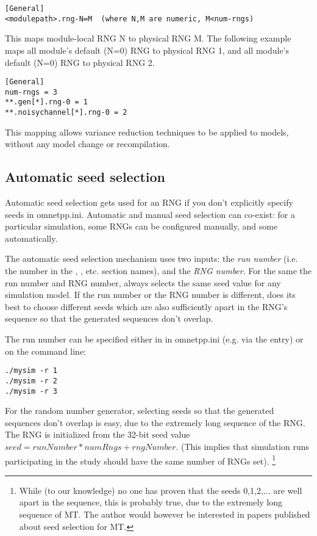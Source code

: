 \begin{verbatim}
[General]
<modulepath>.rng-N=M  (where N,M are numeric, M<num-rngs)
\end{verbatim}

This maps module-local RNG N to physical RNG M. The following
example maps all   module's default (N=0) RNG to physical RNG 1,
and all   module's default (N=0) RNG to physical RNG 2.

\begin{verbatim}
[General]
num-rngs = 3
**.gen[*].rng-0 = 1
**.noisychannel[*].rng-0 = 2
\end{verbatim}

This mapping allows variance reduction techniques to be applied to
{\opp} models, without any model change or recompilation.


\subsection{Automatic seed selection}

Automatic seed selection gets used for an RNG if you don't explicitly
specify seeds in omnetpp.ini. Automatic and manual seed selection can
co-exist: for a particular simulation, some RNGs can be configured
manually, and some automatically.

The automatic seed selection mechanism uses two inputs: the \textit{run number}
(i.e. the number in the \ttt{[Run 1]}, \ttt{[Run 2]}, etc. section names),
and the \textit{RNG number}. For the same the run number and RNG number,
{\opp} always selects the same seed value for any simulation model.
If the run number or the RNG number is different, {\opp} does its best
to choose different seeds which are also sufficiently apart in the RNG's sequence
so that the generated sequences don't overlap.

The run number can be specified either in in omnetpp.ini (e.g. via the
 entry) or on the command line:

\begin{verbatim}
./mysim -r 1
./mysim -r 2
./mysim -r 3
\end{verbatim}

For the  random number generator, selecting seeds
so that the generated sequences don't overlap is easy,
due to the extremely long sequence of the RNG.
The RNG is initialized from the 32-bit seed value $seed = runNumber*numRngs + rngNumber$.
(This implies that simulation runs participating in the study should have
the same number of RNGs set).
    \footnote{While (to our knowledge) no one has proven that the seeds 0,1,2,...
    are well apart in the sequence, this is probably true, due to the extremely
    long sequence of MT. The author would however be interested in papers
    published about seed selection for MT.}

